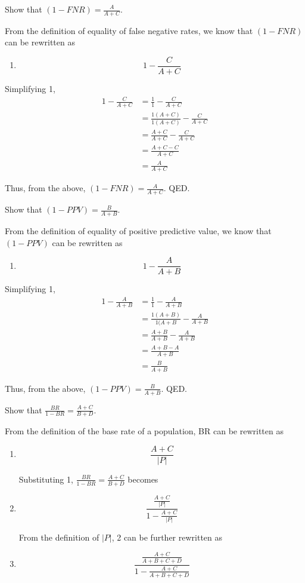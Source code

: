 \documentclass{cisXXX} %
\begin{document}
\maketitle
\HWproblem
Show that $(1-FNR) = \frac{A}{A+C}$.

From the definition of equality of false negative rates, we know that $(1-FNR)$ can be rewritten as 
\begin{enumerate}
\item $$1-\frac{C}{A+C}$$
\end{enumerate}

Simplifying 1,
\begin{align*}
1-\frac{C}{A+C} &= \frac{1}{1} - \frac{C}{A+C}\\
&=\frac{1(A+C)}{1(A+C)} - \frac{C}{A+C}\\
&=\frac{A+C}{A+C} - \frac{C}{A+C}\\
&=\frac{A+C-C}{A+C}\\
&=\frac{A}{A+C}
\end{align*}

Thus, from the above, $(1-FNR) = \frac{A}{A+C}$. QED.

\HWproblem
Show that $(1-PPV) = \frac{B}{A+B}$.

From the definition of equality of positive predictive value, we know that $(1-PPV)$ can be rewritten as
\begin{enumerate}
\item $$1-\frac{A}{A+B}$$
\end{enumerate}

Simplifying 1,
\begin{align*}
1-\frac{A}{A+B} &= \frac{1}{1} - \frac{A}{A+B}\\
&= \frac{1(A+B)}{1(A+B} - \frac{A}{A+B}\\
&= \frac{A+B}{A+B} - \frac{A}{A+B}\\
&= \frac{A+B - A}{A+B}\\
&= \frac{B}{A+B}
\end{align*}

Thus, from the above, $(1-PPV) = \frac{B}{A+B}$. QED.

\HWproblem
Show that $\frac{BR}{1-BR} = \frac{A+C}{B+D}$.

From the definition of the base rate of a population, BR can be rewritten as
\begin{enumerate}
\item $$\frac{A+C}{|P|}$$

Substituting 1, $\frac{BR}{1-BR} = \frac{A+C}{B+D}$ becomes
\item $$\frac{\frac{A+C}{|P|}}{1-\frac{A+C}{|P|}}$$

From the definition of $|P|$, 2 can be further rewritten as
\item $$\frac{\frac{A+C}{A+B+C+D}}{1-\frac{A+C}{A+B+C+D}}$$
\end{enumerate}
\end{document}
